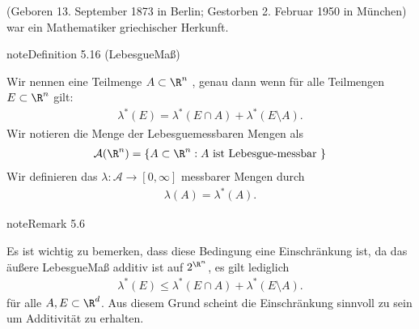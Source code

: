 \documentclass[letterpaper,10pt,german]{jupyterBook}
\begin{document}
\begin{sphinxShadowBox}

\sphinxAtStartPar
{} (Geboren 13. September 1873 in Berlin; Gestorben 2. Februar 1950 in München) war ein Mathematiker griechischer Herkunft.
\end{sphinxShadowBox}
\label{masstheorie/masstheorie:definition-37}
\begin{sphinxadmonition}{note}{Definition 5.16 (Lebesgue\sphinxhyphen{}Maß)}



\sphinxAtStartPar
Wir nennen eine Teilmenge \(A \subset \R^n\) , genau dann wenn für alle Teilmengen \(E \subset \R^n\) gilt:
\begin{equation*}
\begin{split}\lambda^*(E) = \lambda^*(E \cap A) + \lambda^*(E \setminus A).\end{split}
\end{equation*}
\sphinxAtStartPar
Wir notieren die Menge der Lebesgue\sphinxhyphen{}messbaren Mengen als
\begin{equation*}
\begin{split}\mathcal{A}(\R^n) = \lbrace A \subset \R^n : A \text{ ist Lebesgue-messbar } \rbrace\end{split}
\end{equation*}
\sphinxAtStartPar
Wir definieren das  \(\lambda \colon \mathcal{A} \rightarrow [0,\infty]\) messbarer Mengen durch
\begin{equation*}
\begin{split}\lambda(A) = \lambda^*(A).\end{split}
\end{equation*}\end{sphinxadmonition}
\label{masstheorie/masstheorie:remark-38}
\begin{sphinxadmonition}{note}{Remark 5.6}



\sphinxAtStartPar
Es ist wichtig zu bemerken, dass diese Bedingung eine Einschränkung ist, da das äußere Lebesgue\sphinxhyphen{}Maß  additiv ist auf \(2^{\R^n}\), es gilt lediglich
\begin{equation*}
\begin{split}\lambda^*(E) \leq \lambda^*(E \cap A) + \lambda^*(E \setminus A).\end{split}
\end{equation*}
\sphinxAtStartPar
für alle \(A,E\subset\R^d\). Aus diesem Grund scheint die Einschränkung sinnvoll zu sein um Additivität zu erhalten.
\end{sphinxadmonition}
\end{document}
